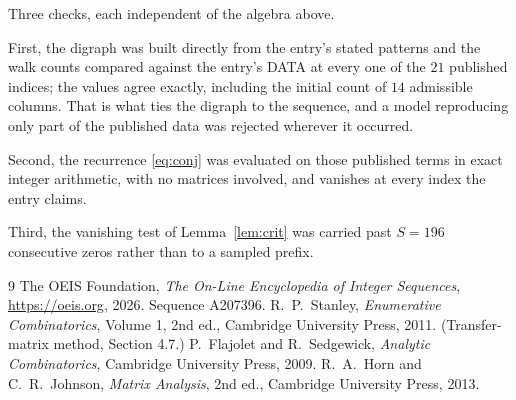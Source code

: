 \documentclass[11pt,a4paper]{article}
\theoremstyle{plain}
\theoremstyle{definition}
\begin{document}
Three checks, each independent of the algebra above.

First, the digraph was built directly from the entry's stated patterns and the walk counts
compared against the entry's DATA at every one of the $21$ published indices; the
values agree exactly, including the initial count of $14$ admissible columns. That is
what ties the digraph to the sequence, and a model reproducing only part of the published
data was rejected wherever it occurred.

Second, the recurrence \eqref{eq:conj} was evaluated on those published terms in exact
integer arithmetic, with no matrices involved, and vanishes at every index the entry claims.

Third, the vanishing test of Lemma~\ref{lem:crit} was carried past $S=196$ consecutive
zeros rather than to a sampled prefix.

\begin{thebibliography}{9}
 The OEIS Foundation, \emph{The On-Line Encyclopedia of Integer
Sequences}, \url{https://oeis.org}, 2026. Sequence A207396.
 R.~P.~Stanley, \emph{Enumerative Combinatorics}, Volume 1, 2nd ed.,
Cambridge University Press, 2011. (Transfer-matrix method, Section 4.7.)
 P.~Flajolet and R.~Sedgewick, \emph{Analytic Combinatorics}, Cambridge
University Press, 2009.
 R.~A.~Horn and C.~R.~Johnson, \emph{Matrix Analysis}, 2nd ed., Cambridge
University Press, 2013.
\end{thebibliography}
\end{document}
